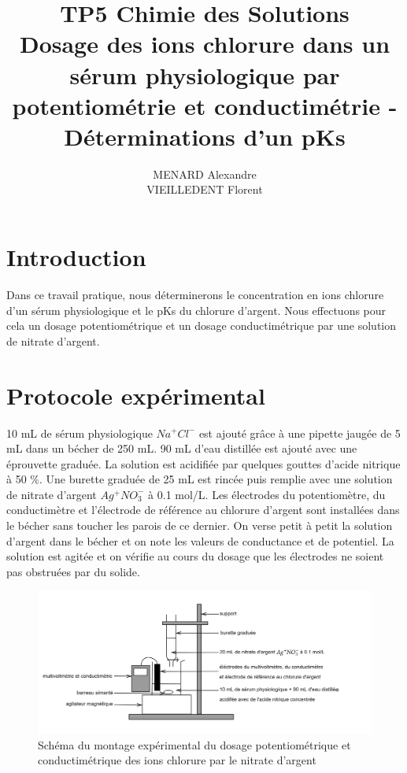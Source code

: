\documentclass[12pt]{article}
\title{\textbf{TP5 Chimie des Solutions} \\ Dosage des ions chlorure dans un sérum physiologique par potentiométrie et conductimétrie - Déterminations d'un pKs}
\author{MENARD Alexandre \\ VIEILLEDENT Florent}
\begin{document}
\maketitle

\section*{Introduction}

Dans ce travail pratique, nous déterminerons le concentration en ions chlorure d'un sérum physiologique et le pKs du chlorure d'argent.
Nous effectuons pour cela un dosage potentiométrique et un dosage conductimétrique par une solution de nitrate d'argent. 

\newpage

\section{Protocole expérimental}

10 mL de sérum physiologique $Na^+Cl^-$ est ajouté grâce à une pipette jaugée de 5 mL dans un bécher de 250 mL.
90 mL d'eau distillée est ajouté avec une éprouvette graduée.
La solution est acidifiée par quelques gouttes d'acide nitrique à 50 $\%$.
Une burette graduée de 25 mL est rincée puis remplie avec une solution de nitrate d'argent $Ag^+ NO_3^-$ à 0.1 mol/L.
Les électrodes du potentiomètre, du conductimètre et l'électrode de référence au chlorure d'argent sont installées dans le bécher sans toucher les parois de ce dernier.
On verse petit à petit la solution d'argent dans le bécher et on note les valeurs de conductance et de potentiel. 
La solution est agitée et on vérifie au cours du dosage que les électrodes ne soient pas obstruées par du solide.

\begin{figure}[h!]
    \begin{center}
        \includegraphics[scale=0.2]{Schema_montage.png}
        \caption{Schéma du montage expérimental du dosage potentiométrique et conductimétrique des ions chlorure par le nitrate d'argent}
        \label{img1:Schema_montage}
    \end{center}
\end{figure}
\end{document}
